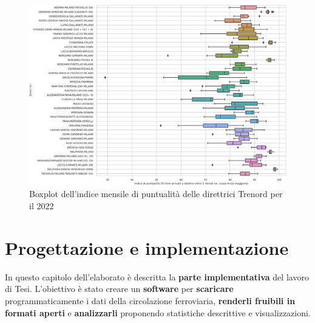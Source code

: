 \documentclass[12pt,a4paper,italian]{report}
\begin{document}
\begin{figure}
    \centering
    \includegraphics[width=1\textwidth]{images/lomb_boxplot.pdf}
    \caption{Boxplot dell'indice mensile di puntualità delle
        direttrici Trenord per il 2022}
    \label{figure:lomb_boxplot}
\end{figure}

\chapter{Progettazione e implementazione}
\label{progettazione}

In questo capitolo dell'elaborato è descritta la \textbf{parte
    implementativa} del lavoro di Tesi.  L'obiettivo è stato creare un
\textbf{software} per \textbf{scaricare} programmaticamente i dati
della circolazione ferroviaria, \textbf{renderli fruibili in formati
    aperti}
e \textbf{analizzarli} proponendo statistiche descrittive e
visualizzazioni.
\end{document}
